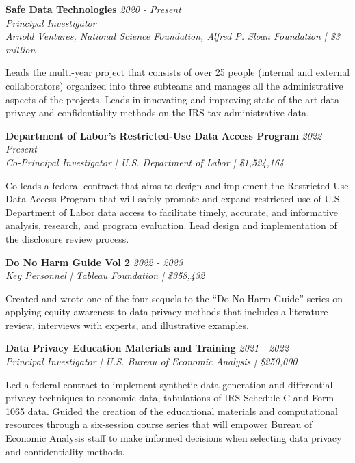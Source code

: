 \textbf{Safe Data Technologies} \hfill \textit{2020 - Present}\\
\textit{Principal Investigator}\\ 
\textit{Arnold Ventures, National Science Foundation, Alfred P. Sloan Foundation | \$3 million}

Leads the multi-year project that consists of over 25 people (internal and external collaborators) organized into three subteams and manages all the administrative aspects of the projects. Leads in innovating and improving state-of-the-art data privacy and confidentiality methods on the IRS tax administrative data.

\projectspace
\textbf{Department of Labor's Restricted-Use Data Access Program } \hfill \textit{2022 - Present}\\
\textit{Co-Principal Investigator | U.S. Department of Labor | \$1,524,164}

Co-leads a federal contract that aims to design and implement the Restricted-Use Data Access Program that will safely promote and expand restricted-use of U.S. Department of Labor data access to facilitate timely, accurate, and informative analysis, research, and program evaluation. Lead design and implementation of the disclosure review process. 

\projectspace
\textbf{Do No Harm Guide Vol 2} \hfill \textit{2022 - 2023}\\
\textit{Key Personnel | Tableau Foundation | \$358,432}

Created and wrote one of the four sequels to the ``Do No Harm Guide'' series on applying equity awareness to data privacy methods that includes a literature review, interviews with experts, and illustrative examples.

\projectspace
\textbf{Data Privacy Education Materials and Training } \hfill \textit{2021 - 2022}\\
\textit{Principal Investigator | U.S. Bureau of Economic Analysis | \$250,000}

Led a federal contract to implement synthetic data generation and differential privacy techniques to economic data, tabulations of IRS Schedule C and Form 1065 data. Guided the creation of the educational materials and computational resources through a six-session course series that will empower Bureau of Economic Analysis staff to make informed decisions when selecting data privacy and confidentiality methods.


